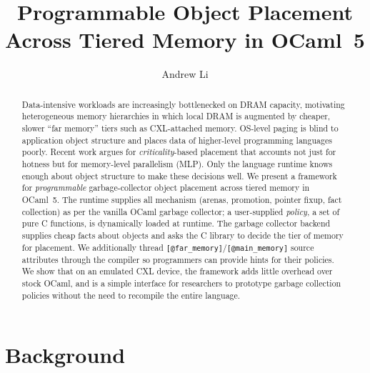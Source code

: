 \documentclass[sigconf]{acmart}
\begin{document}
\title{Programmable Object Placement Across Tiered Memory in OCaml~5}

\author{Andrew Li}

\begin{abstract}
Data-intensive workloads are increasingly bottlenecked on DRAM capacity,
motivating heterogeneous memory hierarchies in which local DRAM is augmented by
cheaper, slower ``far memory'' tiers such as CXL-attached memory. OS-level
paging is blind to application object structure and places data of higher-level programming languages poorly.
Recent work argues for \emph{criticality}-based placement that accounts not just
for hotness but for memory-level parallelism (MLP). Only the language runtime
knows enough about object structure to make these decisions well. We present a
framework for \emph{programmable} garbage-collector object placement across
tiered memory in OCaml~5. The runtime supplies all mechanism (arenas, promotion, pointer
fixup, fact collection) as per the vanilla OCaml garbage collector; a user-supplied \emph{policy}, a set of pure C functions,
is dynamically loaded at runtime. The garbage collector backend supplies cheap facts about objects and asks the C library to decide
the tier of memory for placement. We additionally thread \texttt{[@far\_memory]}/\texttt{[@main\_memory]} source
attributes through the compiler so programmers can provide hints for their policies.
We show that on an emulated CXL device, the framework adds little overhead over stock OCaml, and is a simple interface for researchers to prototype
garbage collection policies without the need to recompile the entire language.
\end{abstract}


\maketitle

\section{Background}
\end{document}
